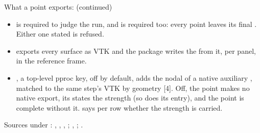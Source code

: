 \begin{frame}{What a point exports: \code{[exports]} (continued)}
\begin{itemize}\small
  \item {} is required to judge the run, and 
        is required too: every point leaves its final
        . Either one stated  is refused.
  \item {} exports every surface as VTK and the package writes the
         from it, per panel, in the reference frame.
  \item {}, a top-level pproc key, off by
        default, adds the nodal  of a native
        auxiliary , matched to the same step's
        VTK by geometry [4]. Off, the point makes no native export, its
         states the strength  (so does its
         entry), and the point is complete without it.
         says per row whether the strength is carried.
\end{itemize}
{\tiny\color{SoftGray} Sources under :
, , ,
; ,
; .\par}
\end{frame}

